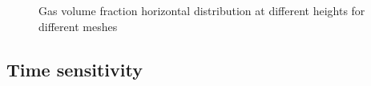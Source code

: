 \documentclass[11pt,a4paper]{article}
\begin{document}
\begin{figure}[H]
    \centering
    \caption[]{Gas volume fraction horizontal distribution at different heights for different meshes}
    \label{fig:alpha_mesh}
\end{figure}

\subsection{Time sensitivity}
\label{sub:time_sensitivity}
\end{document}
